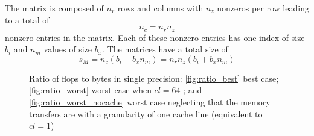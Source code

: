\documentclass{sig-alternate}
\begin{document}
The matrix is composed of $n_r$ rows and columns with $n_z$ nonzeros
per row leading to a total of $$n_c = n_r n_z$$ nonzero entries in
the matrix. Each of these nonzero entries has one index of size $b_i$
and $n_m$ values of size $b_x$. The matrices have a total size
of $$s_M = n_c (b_i + b_x n_m) = n_r n_z (b_i + b_x n_m)$$

\begin{figure}[tbh]
  \centering
  
  \caption{Ratio of flops to bytes in single precision:  
    \ref{fig:ratio_best} best case; \ref{fig:ratio_worst} worst case when $cl=64$ 
    ; and \ref{fig:ratio_worst_nocache} worst case neglecting that the
    memory transfers are with a granularity of one cache line (equivalent to $cl = 1$)}
  \label{fig:ratio_bytes_flops}
\end{figure}
\end{document}
